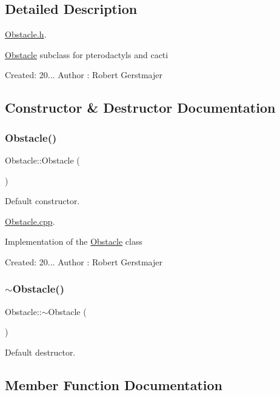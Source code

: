 \subsection{Detailed Description}
\mbox{\hyperlink{_obstacle_8h}{Obstacle.\+h}}. 

\mbox{\hyperlink{class_obstacle}{Obstacle}} subclass for pterodactyls and cacti

Created\+: 20... Author \+: Robert Gerstmajer 

\subsection{Constructor \& Destructor Documentation}
\mbox{\label{class_obstacle_a8f734072321fa06a7b7dae2d5f50f352}} 
\subsubsection{\texorpdfstring{Obstacle()}{Obstacle()}}
{\footnotesize\ttfamily Obstacle\+::\+Obstacle (\begin{DoxyParamCaption}{ }\end{DoxyParamCaption})}



Default constructor. 

\mbox{\hyperlink{_obstacle_8cpp}{Obstacle.\+cpp}}.

Implementation of the \mbox{\hyperlink{class_obstacle}{Obstacle}} class

Created\+: 20... Author \+: Robert Gerstmajer \mbox{\label{class_obstacle_af2f9cc9c6cff75dca0974fd5ac4f71a9}} 
\subsubsection{\texorpdfstring{$\sim$\+Obstacle()}{~Obstacle()}}
{\footnotesize\ttfamily Obstacle\+::$\sim$\+Obstacle (\begin{DoxyParamCaption}{ }\end{DoxyParamCaption})}



Default destructor. 



\subsection{Member Function Documentation}
\mbox{\label{class_obstacle_af06377faeba537b4ff98ee2cfa061831}} 
